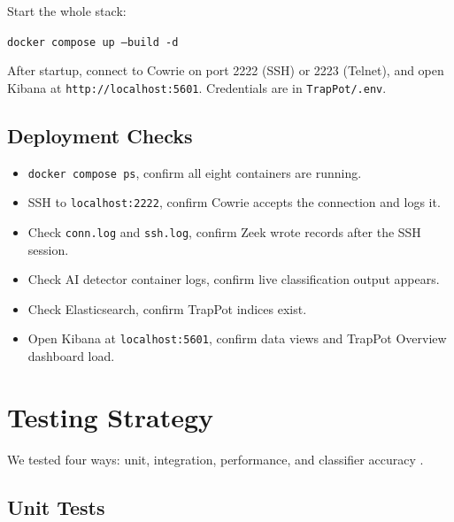 Start the whole stack:

\begin{center}
\texttt{docker compose up --build -d}
\end{center}

After startup, connect to Cowrie on port 2222 (SSH) or 2223 (Telnet), and open Kibana at \texttt{http://localhost:5601}. Credentials are in \texttt{TrapPot/.env}.

\subsection{Deployment Checks}
\label{subsec:deployment_verification}

\begin{itemize}
\item \texttt{docker compose ps}, confirm all eight containers are running.
\item SSH to \texttt{localhost:2222}, confirm Cowrie accepts the connection and logs it.
\item Check \texttt{conn.log} and \texttt{ssh.log}, confirm Zeek wrote records after the SSH session.
\item Check AI detector container logs, confirm live classification output appears.
\item Check Elasticsearch, confirm TrapPot indices exist.
\item Open Kibana at \texttt{localhost:5601}, confirm data views and TrapPot Overview dashboard load.
\end{itemize}

\section{Testing Strategy}
\label{sec:testing_strategy}

We tested four ways: unit, integration, performance, and classifier accuracy \cite{confusion2023pmc,mary2024network,hindy2023comprehensive}.

\subsection{Unit Tests}
\label{subsec:unit_testing}

